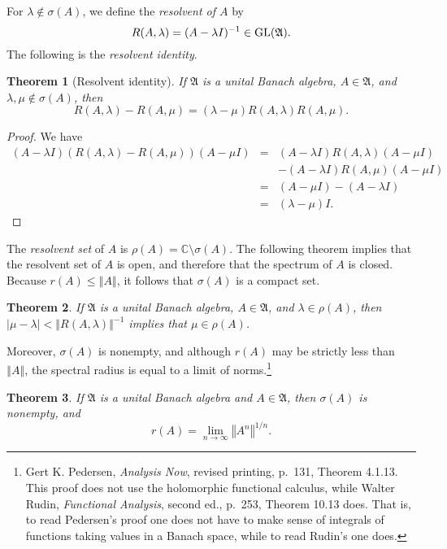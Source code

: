 \documentclass{article}
\newcommand{\GL}{\ensuremath\mathrm{GL}}
\newcommand{\norm}[1]{\left\Vert #1 \right\Vert}
\newtheorem{theorem}{Theorem}
\theoremstyle{definition}
\begin{document}
 
For $\lambda \not \in \sigma(A)$, we define the {\em resolvent of $A$} by 
\[
R(A,\lambda)=(A-\lambda I)^{-1} \in \GL(\mathfrak{A}).
\]
The following is the {\em resolvent identity}.

\begin{theorem}[Resolvent identity]
If $\mathfrak{A}$ is a unital Banach algebra, $A \in \mathfrak{A}$, and $\lambda,\mu \not \in \sigma(A)$, then
\[
R(A,\lambda)-R(A,\mu) = (\lambda-\mu)R(A,\lambda)R(A,\mu).
\]
\label{resolvent}
\end{theorem}
\begin{proof}
We have
\begin{eqnarray*}
(A-\lambda I)(R(A,\lambda)-R(A,\mu))(A-\mu I)&=&(A-\lambda I)R(A,\lambda)(A-\mu I)\\
&&-(A-\lambda I)R(A,\mu)(A-\mu I)\\
&=&(A-\mu I)-(A-\lambda I)\\
&=&(\lambda -\mu)I.
\end{eqnarray*}
\end{proof}

The {\em resolvent set} of $A$ is $\rho(A)=\mathbb{C} \setminus \sigma(A)$.
The following theorem implies that the resolvent set of $A$ is  open, and therefore that the spectrum
of $A$ is  closed. Because $r(A) \leq \norm{A}$, it follows that $\sigma(A)$ is a compact set.

\begin{theorem}
If $\mathfrak{A}$ is a unital Banach algebra, $A \in \mathfrak{A}$, and $\lambda \in \rho(A)$, then $|\mu-\lambda| < \norm{R(A,\lambda)}^{-1}$
implies that $\mu \in \rho(A)$.
\label{open}
\end{theorem}


Moreover, $\sigma(A)$ is nonempty, and although $r(A)$ may be strictly less than $\norm{A}$, the spectral
radius  is equal to a limit of
norms.\footnote{Gert K. Pedersen, {\em Analysis Now}, revised printing, p.~131, Theorem 4.1.13. This proof does not use the holomorphic functional
calculus, while Walter Rudin, {\em Functional Analysis}, second ed., p.~253, Theorem 10.13 does. That is, to read Pedersen's proof one does
not have to make sense of   integrals of functions taking values in a Banach space, while to read Rudin's one does.}

\begin{theorem}
If $\mathfrak{A}$ is a unital Banach algebra and $A \in \mathfrak{A}$, then
 $\sigma(A)$ is  nonempty, and
\[
r(A) = \lim_{n \to \infty} \norm{A^n}^{1/n}.
\]
\end{theorem}
\end{document}
